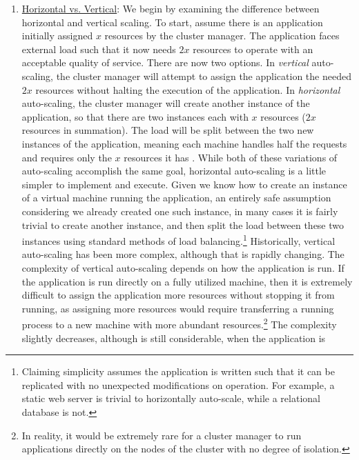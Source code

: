 \begin{enumerate}
  \item \underline{Horizontal vs. Vertical}: We begin by examining
    the difference between horizontal and vertical scaling.
    To start, assume there is an application initially assigned $x$ resources by the
    cluster manager. The application
    faces external load such that it now needs $2x$ resources to operate with an
    acceptable quality of service. There are now two options. In
    \textit{vertical} auto-scaling, the cluster manager will attempt to assign
    the application the needed $2x$ resources
    without halting the execution of the application. In \textit{horizontal}
    auto-scaling, the cluster manager will create another instance of
    the application, so that there are two instances each with
    $x$ resources ($2x$ resources in summation). The load will be split between
    the two new instances of the application, meaning each machine handles half
    the requests and requires only the $x$ resources it has
    \cite{auto-scaling-techniques-for-elastic-applications-in-cloud-environments}. While
    both of these variations of auto-scaling accomplish the same goal, horizontal
    auto-scaling is a little simpler to implement and execute.
    Given we know how to create an instance of a
    virtual machine running the application, an entirely safe assumption
    considering we already created one such instance, in many cases it is
    fairly trivial to create
    another instance, and then split the load between these two instances using
    standard methods of load balancing.\footnote{Claiming
    simplicity assumes the application is written
    such that it can be replicated with no unexpected modifications
    on operation. For example, a static web server is trivial to horizontally
    auto-scale, while a relational database is not.}
    Historically, vertical auto-scaling has been more complex,
    although that is rapidly changing.
    The complexity of vertical auto-scaling depends on how the application
    is run. If the application is run directly on a fully utilized machine,
    then it is extremely difficult to assign the application more resources
    without stopping it from running, as assigning more resources
    would require transferring a running
    process to a new machine with more abundant resources.\footnote{In reality,
    it would be extremely rare for a cluster manager to run applications
    directly on the nodes of the cluster with no degree of isolation.} The complexity
    slightly decreases, although is still considerable, when the application is

\end{enumerate}
